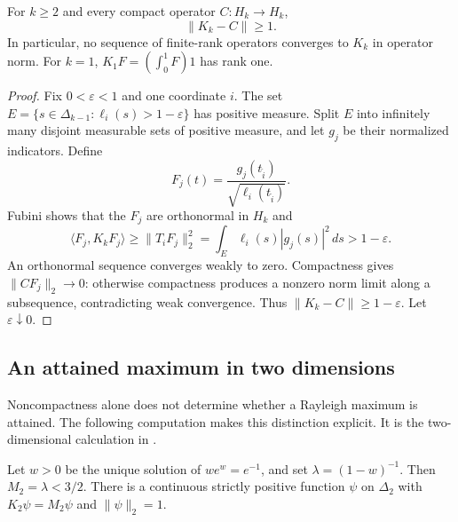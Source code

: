 \documentclass[11pt]{article}
\begin{document}
\begin{proposition}\label{prop:noncompact}
For $k\geq2$ and every compact operator $C:H_k\to H_k$,
\[
                         \|K_k-C\|\geq1.
\]
In particular, no sequence of finite-rank operators converges to $K_k$
in operator norm.  For $k=1$, $K_1F=(\int_0^1F)1$ has rank one.
\end{proposition}

\begin{proof}
Fix $0<\varepsilon<1$ and one coordinate $i$.
The set $E=\{s\in\Delta_{k-1}:\ell_i(s)>1-\varepsilon\}$
has positive measure.  Split $E$ into infinitely many disjoint measurable
sets of positive measure, and let $g_j$ be their normalized indicators.
Define
\[
 F_j(t)=\frac{g_j(t_{\widehat i})}
                 {\sqrt{\ell_i(t_{\widehat i})}}.
\]
Fubini shows that the $F_j$ are orthonormal in $H_k$ and
\[
 \langle F_j,K_kF_j\rangle
 \geq\|T_iF_j\|_2^2
 =\int_E\ell_i(s)|g_j(s)|^2\,ds>1-\varepsilon.
\]
An orthonormal sequence converges weakly to zero.  Compactness gives
$\|CF_j\|_2\to0$: otherwise compactness produces a nonzero norm limit
along a subsequence, contradicting weak convergence.
Thus $\|K_k-C\|\geq1-\varepsilon$.  Let $\varepsilon\downarrow0$.
\end{proof}

\subsection{An attained maximum in two dimensions}

Noncompactness alone does not determine whether a Rayleigh maximum is
attained.  The following computation makes this distinction explicit.
It is the two-dimensional calculation in
\cite[Corollaries 35--36]{Polymath}.

\begin{proposition}\label{prop:m2}
Let $w>0$ be the unique solution of $we^w=e^{-1}$, and set
$\lambda=(1-w)^{-1}$.  Then $M_2=\lambda<3/2$.
There is a continuous strictly positive function $\psi$ on $\Delta_2$
with $K_2\psi=M_2\psi$ and $\|\psi\|_2=1$.
\end{proposition}
\end{document}
